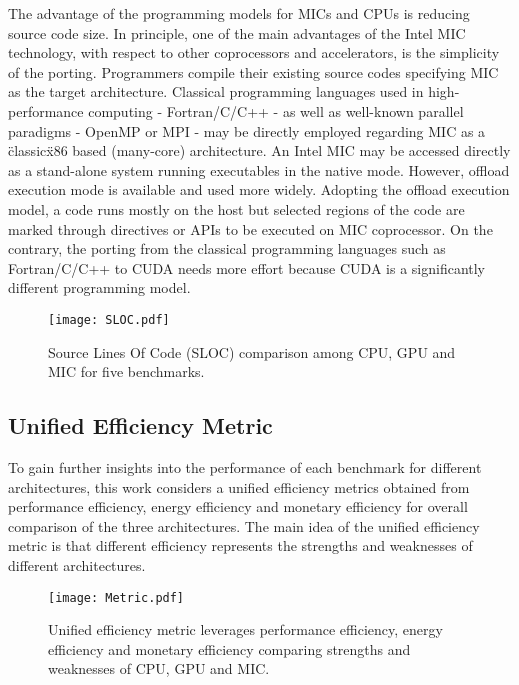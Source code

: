  The advantage of the programming models for MICs and CPUs is reducing source code size. In principle, one of the main advantages of the Intel MIC technology, with respect to other coprocessors and accelerators, is the simplicity of the porting. Programmers compile their existing source codes specifying MIC as the target architecture. Classical programming languages used in high-performance computing - Fortran/C/C++ - as well as well-known parallel paradigms - OpenMP or MPI - may be directly employed regarding MIC as a \"classic\" x86 based (many-core) architecture. An Intel MIC may be accessed directly as a stand-alone system running executables in the native mode. However, offload execution mode is available and used more widely. Adopting the offload execution model, a code runs mostly on the host but selected regions of the code are marked through directives or APIs to be executed on MIC coprocessor. On the contrary, the porting from the classical programming languages such as Fortran/C/C++ to CUDA needs more effort because CUDA is a significantly different programming model.

  
    \begin{figure}[h!]
  \centering
  \begin{minipage}{0.5\textwidth}
    \centering
   \centering
     \texttt{[image: SLOC.pdf]}    
  \caption{Source Lines Of Code (SLOC) comparison among CPU, GPU and MIC for five benchmarks.}
  \label{fig:sloc}
\end{minipage}%
\end{figure}

\subsection{Unified Efficiency Metric}

To gain further insights into the performance of each benchmark for different architectures, this work considers a unified efficiency metrics obtained from performance efficiency, energy efficiency and monetary efficiency for overall comparison of the three architectures. The main idea of the unified efficiency metric is that different efficiency represents the strengths and weaknesses of different architectures.

    \begin{figure}[h!]
  \centering
  \begin{minipage}{0.5\textwidth}
    \centering
   \centering
     \texttt{[image: Metric.pdf]}    
  \caption{Unified efficiency metric leverages performance efficiency, energy efficiency and monetary efficiency comparing strengths and weaknesses of CPU, GPU and MIC.}
  \label{fig:metric}
\end{minipage}%
\end{figure}

